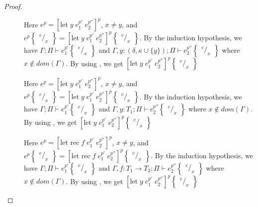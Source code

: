 \documentclass[../../master.tex]{subfiles}
\begin{document}
\begin{proof}
\begin{description}
		\item[] Here $e^p=[\mbox{let}\;y\;e_1^{p'}\;e_2^{p''}]^p$, $x\neq y$, and $e^p\begin{Bmatrix} ^v/_x \end{Bmatrix}=[\mbox{let}\;y\;e_1^{p'}\;e_2^{p''}]^p\begin{Bmatrix} ^v/_x \end{Bmatrix}$.
			By the induction hypothesis, we have $\Gamma;\Pi\vdash e_1^{p'}\begin{Bmatrix} ^v/_x \end{Bmatrix}$ and $\Gamma,y:(\delta,\kappa\cup\{y\});\Pi\vdash e_2^{p''}\begin{Bmatrix} ^v/_x \end{Bmatrix}$ where $x\notin dom(\Gamma)$.
			By using , we get $[\mbox{let}\;y\;e_1^{p'}\;e_2^{p''}]^p\begin{Bmatrix} ^v/_x \end{Bmatrix}$

		\item[] Here $e^p=[\mbox{let}\;y\;e_1^{p'}\;e_2^{p''}]^p$, $x\neq y$, and $e^p\begin{Bmatrix} ^v/_x \end{Bmatrix}=[\mbox{let}\;y\;e_1^{p'}\;e_2^{p''}]^p\begin{Bmatrix} ^v/_x \end{Bmatrix}$.
			By the induction hypothesis, we have $\Gamma;\Pi\vdash e_1^{p'}\begin{Bmatrix} ^v/_x \end{Bmatrix}$ and $\Gamma,y:T_1;\Pi\vdash e_2^{p''}\begin{Bmatrix} ^v/_x \end{Bmatrix}$ where $x\notin dom(\Gamma)$.
			By using , we get $[\mbox{let}\;y\;e_1^{p'}\;e_2^{p''}]^p\begin{Bmatrix} ^v/_x \end{Bmatrix}$

		\item[] Here $e^p=[\mbox{let rec}\;f\;e_1^{p'}\;e_2^{p''}]^p$, $x\neq y$, and $e^p\begin{Bmatrix} ^v/_x \end{Bmatrix}=[\mbox{let rec}\;f\;e_1^{p'}\;e_2^{p''}]^p\begin{Bmatrix} ^v/_x \end{Bmatrix}$.
			By the induction hypothesis, we have $\Gamma;\Pi\vdash e_1^{p'}\begin{Bmatrix} ^v/_x \end{Bmatrix}$ and $\Gamma,f:T_1\rightarrow T_2;\Pi\vdash e_2^{p''}\begin{Bmatrix} ^v/_x \end{Bmatrix}$ where $x\notin dom(\Gamma)$.
			By using , we get $[\mbox{let}\;y\;e_1^{p'}\;e_2^{p''}]^p\begin{Bmatrix} ^v/_x \end{Bmatrix}$
	\end{description}
\end{proof}
\end{document}
